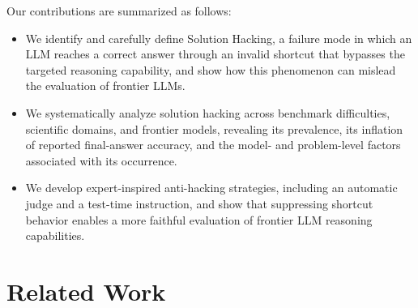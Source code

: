 Our contributions are summarized as follows:
\begin{itemize}
\item We identify and carefully define Solution Hacking, a failure mode in which an LLM reaches a correct answer through an invalid shortcut that bypasses the targeted reasoning capability, and show how this phenomenon can mislead the evaluation of frontier LLMs.
\item We systematically analyze solution hacking across benchmark difficulties, scientific domains, and frontier models, revealing its prevalence, its inflation of reported final-answer accuracy, and the model- and problem-level factors associated with its occurrence.
\item We develop expert-inspired anti-hacking strategies, including an automatic judge and a test-time instruction, and show that suppressing shortcut behavior enables a more faithful evaluation of frontier LLM reasoning capabilities.
\end{itemize}



\section{Related Work}
\label{sec:related}

